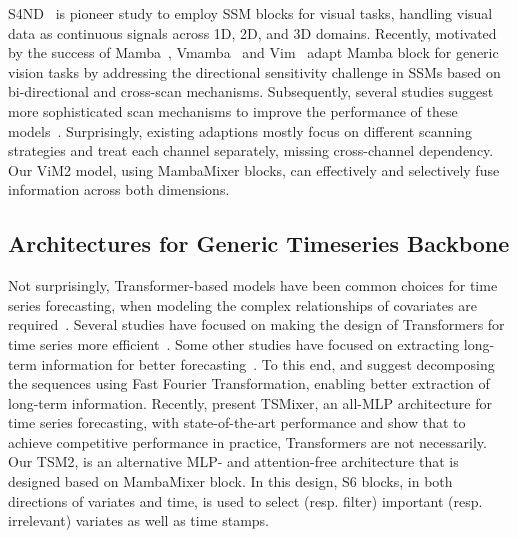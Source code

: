 \documentclass{article}
\newcommand{\head}[1]{\vspace{1.7mm}\noindent{{\textcolor{c1}{\bf #1.}}}}
\begin{document}
\head{SSM-based Generic Vision Models}
S4ND~\citep{nguyen2022s4nd} is pioneer study to employ SSM blocks for visual tasks, handling visual data as continuous signals across 1D, 2D, and 3D domains. Recently, motivated by the success of Mamba~\citep{gu2023mamba}, Vmamba~\citep{liu2024vmamba} and Vim~\citep{zhu2024ViM} adapt Mamba block for generic vision tasks by addressing the directional sensitivity challenge in SSMs based on bi-directional and cross-scan mechanisms. Subsequently, several studies suggest more sophisticated scan mechanisms to improve the performance of these models~\citep{li2024mamband, huang2024localmamba, hu2024zigma}. Surprisingly, existing adaptions mostly focus on different scanning strategies and treat each channel separately, missing cross-channel dependency. Our ViM2 model, using MambaMixer blocks, can effectively and selectively fuse information across both dimensions.
 






\subsection{Architectures for Generic Timeseries Backbone}
Not surprisingly, Transformer-based models have been common choices for time series forecasting, when modeling the complex relationships of covariates are required~\citep{zhou2021informer, liu2021pyraformer, wu2021autoformer, ilbert2024unlocking, nie2023a}. Several studies have focused on making the design of Transformers for time series more efficient~\citep{zhou2021informer, wu2021autoformer}. Some other studies have focused on extracting long-term information for better forecasting~\citep{nie2023a, zhou2022film}. To this end, \citet{zhou2022film} and \citet{zhou2022fedformer} suggest decomposing the sequences using Fast Fourier Transformation, enabling better extraction of long-term information. Recently, \citet{chen2023tsmixer} present TSMixer, an all-MLP architecture for time series forecasting, with state-of-the-art performance and show that to achieve competitive performance in practice, Transformers are not necessarily. Our TSM2, is an alternative MLP- and attention-free architecture that is designed based on MambaMixer block. In this design, S6 blocks, in both directions of variates and time, is used to select (resp. filter) important (resp. irrelevant) variates as well as time stamps. 
\end{document}
